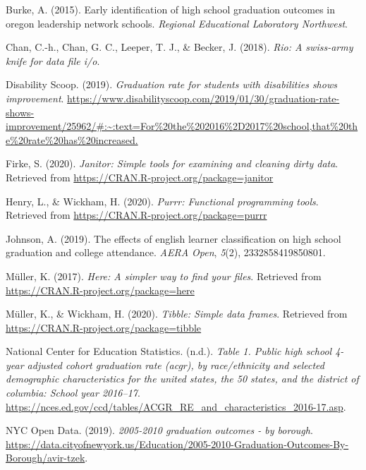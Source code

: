 \documentclass[
  english,
  man, fleqn, noextraspace]{apa6}
\begin{document}
\leavevmode\hypertarget{ref-burke2015early}{}%
Burke, A. (2015). Early identification of high school graduation outcomes in oregon leadership network schools. \emph{Regional Educational Laboratory Northwest}.

\leavevmode\hypertarget{ref-R-rio}{}%
Chan, C.-h., Chan, G. C., Leeper, T. J., \& Becker, J. (2018). \emph{Rio: A swiss-army knife for data file i/o}.

\leavevmode\hypertarget{ref-Graduati54:online}{}%
Disability Scoop. (2019). \emph{Graduation rate for students with disabilities shows improvement}. \url{https://www.disabilityscoop.com/2019/01/30/graduation-rate-shows-improvement/25962/\#:~:text=For\%20the\%202016\%2D2017\%20school,that\%20the\%20rate\%20has\%20increased.}

\leavevmode\hypertarget{ref-R-janitor}{}%
Firke, S. (2020). \emph{Janitor: Simple tools for examining and cleaning dirty data}. Retrieved from \url{https://CRAN.R-project.org/package=janitor}

\leavevmode\hypertarget{ref-R-purrr}{}%
Henry, L., \& Wickham, H. (2020). \emph{Purrr: Functional programming tools}. Retrieved from \url{https://CRAN.R-project.org/package=purrr}

\leavevmode\hypertarget{ref-johnson2019effects}{}%
Johnson, A. (2019). The effects of english learner classification on high school graduation and college attendance. \emph{AERA Open}, \emph{5}(2), 2332858419850801.

\leavevmode\hypertarget{ref-R-here}{}%
Müller, K. (2017). \emph{Here: A simpler way to find your files}. Retrieved from \url{https://CRAN.R-project.org/package=here}

\leavevmode\hypertarget{ref-R-tibble}{}%
Müller, K., \& Wickham, H. (2020). \emph{Tibble: Simple data frames}. Retrieved from \url{https://CRAN.R-project.org/package=tibble}

\leavevmode\hypertarget{ref-Table1Pu71:online}{}%
National Center for Education Statistics. (n.d.). \emph{Table 1. Public high school 4-year adjusted cohort graduation rate (acgr), by race/ethnicity and selected demographic characteristics for the united states, the 50 states, and the district of columbia: School year 2016--17}. \url{https://nces.ed.gov/ccd/tables/ACGR_RE_and_characteristics_2016-17.asp}.

\leavevmode\hypertarget{ref-2005201053:online}{}%
NYC Open Data. (2019). \emph{2005-2010 graduation outcomes - by borough}. \url{https://data.cityofnewyork.us/Education/2005-2010-Graduation-Outcomes-By-Borough/avir-tzek}.
\end{document}
